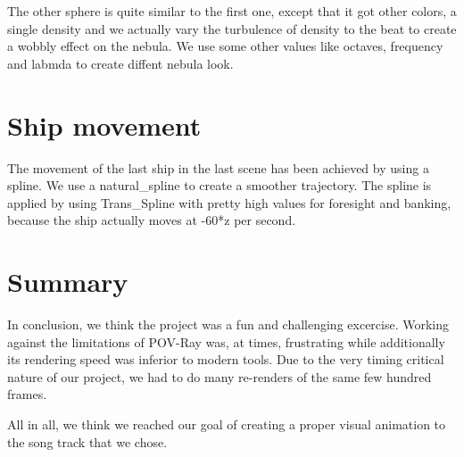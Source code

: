 \documentclass[a4paper, 12pt]{scrartcl}
\begin{document}
    The other sphere is quite similar to the first one, except that it got other colors, a single density and we actually vary the turbulence of density to the beat to create a wobbly effect on the nebula. 
    We use some other values like octaves, frequency and labmda to create diffent nebula look.

    \section{Ship movement}

    The movement of the last ship in the last scene has been achieved by using a spline. We
    use a natural\_spline to create a smoother trajectory. The spline is applied by using
    Trans\_Spline with pretty high values for foresight and banking, because the ship actually
    moves at -60*z per second.

    \section{Summary}

    In conclusion, we think the project was a fun and challenging excercise. Working against the
    limitations of POV-Ray was, at times, frustrating while additionally its rendering speed was
    inferior to modern tools. Due to the very timing critical nature of our project, we had to do
    many re-renders of the same few hundred frames.

    All in all, we think we reached our goal of creating a proper visual animation to the song
    track that we chose.
\end{document}
